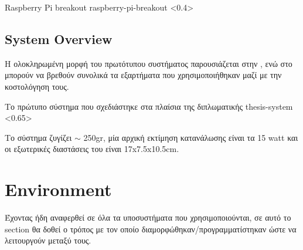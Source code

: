 %
{Raspberry Pi breakout}%
{raspberry-pi-breakout}%
<0.4>


\subsection{System Overview}
Η ολοκληρωμένη μορφή του πρωτότυπου συστήματος παρουσιάζεται στην , ενώ στο  μπορούν να βρεθούν συνολικά τα εξαρτήματα που χρησιμοποιήθηκαν μαζί με την κοστολόγηση τους. 

{Το πρώτυπο σύστημα που σχεδιάστηκε στα πλαίσια της διπλωματικής}%
{thesis-system}%
<0.65>

Το σύστημα ζυγίζει $\sim$ 250gr, μία αρχική εκτίμηση κατανάλωσης είναι τα 15 watt και οι εξωτερικές διαστάσεις του είναι 17x7.5x10.5cm.

\begin{table}[H]
    \caption[]{Bill of Materials}
    \label{tab:thesis-system-bom}
    \centering
  \end{table}


\section{Environment}
Έχοντας ήδη αναφερθεί σε όλα τα υποσυστήματα που χρησιμοποιούνται, σε αυτό το section θα δοθεί ο τρόπος με τον οποίο διαμορφώθηκαν/προγραμματίστηκαν ώστε να λειτουργούν μεταξύ τους.

